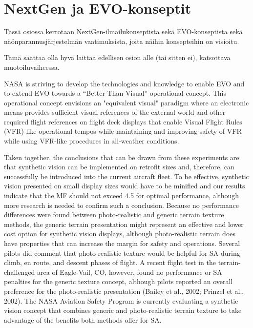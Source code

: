 \documentclass[utf8,bachelor,manualbib]{gradu3}
\begin{document}
\section{NextGen ja EVO-konseptit}

Tässä osiossa kerrotaan NextGen-ilmailukonseptista sekä EVO-konseptista sekä näönparannusjärjestelmän vaatimuksista, joita näihin konsepteihin on visioitu.

Tämä saattaa olla hyvä laittaa edellisen osion alle (tai sitten ei), katsottava muotoiluvaiheessa.

NASA is striving to develop the technologies and knowledge to enable EVO and to extend EVO towards a “Better-Than-Visual” operational concept. This operational concept envisions an "equivalent visual" paradigm where an electronic means provides sufficient visual references of the external world and other required flight references on flight deck displays that enable Visual Flight Rules (VFR)-like operational tempos while maintaining and improving safety of VFR while using VFR-like procedures in all-weather conditions.\citep{prinzel2013}

Taken together, the conclusions that can be drawn from these experiments are that
synthetic vision can be implemented on retrofit sizes and, therefore, can successfully
be introduced into the current aircraft fleet. To be effective, synthetic vision
presented on small display sizes would have to be minified and our results indicate
that the MF should not exceed 4.5 for optimal performance, although more research
is needed to confirm such a conclusion.
Because no performance differences were found between photo-realistic and
generic terrain texture methods, the generic terrain presentation might represent an
effective and lower cost option for synthetic vision displays, although photo-realistic
terrain does have properties that can increase the margin for safety and operations.
Several pilots did comment that photo-realistic texture would be helpful for
SA during climb, en route, and descent phases of flight. A recent flight test in the
terrain-challenged area of Eagle-Vail, CO, however, found no performance or SA
penalties for the generic texture concept, although pilots reported an overall preference
for the photo-realistic presentation (Bailey et al., 2002; Prinzel et al., 2002).
The NASA Aviation Safety Program is currently evaluating a synthetic vision concept
that combines generic and photo-realistic terrain texture to take advantage of
the benefits both methods offer for SA. \citep{prinzel2004}
\end{document}
